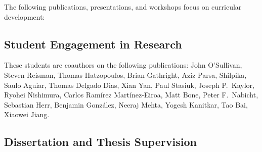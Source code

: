 The following publications, presentations, and workshops focus on curricular development:

\begin{refsection}
\nocite{Scala_2019}
\nocite{CDERBook}
\nocite{ScalaDays_2017}
\nocite{wl_honig_framework_2015}
\nocite{mark_lewis_scala_2014}
\nocite{mark_lewis_using_2013}
\nocite{EduPar2012}
\nocite{EduPar2011}
\nocite{2003_AOSD}
\nocite{chung2003}
\nocite{Triveni_OOPSLAEDU_1998}
\nocite{Laufer_MCC_1997}
\printbibliography[heading=none,sorting=ynt]
\end{refsection}
   

\subsection{Student Engagement in Research}

These students are coauthors on the following publications:
John O’Sullivan,
Steven Reisman, 
Thomas Hatzopoulos, 
Brian Gathright, 
Aziz Parsa,
Shilpika, 
Saulo Aguiar,
Thomas Delgado Dias, 
Xian Yan,
Paul Stasiuk,
Joseph P.\ Kaylor,
Ryohei Nishimura, 
Carlos Ramírez Martínez-Eiroa,
Matt Bone, 
Peter F.\ Nabicht,
Sebastian Herr,
Benjamin González,
Neeraj Mehta, 
Yogesh Kanitkar,
Tao Bai,
Xiaowei Jiang.

\begin{refsection}
\nocite{Scala_2019}
\nocite{doi:10.4137/EBO.S32757}
\nocite{WSSSPE_2015}
\nocite{GCASR_2015}
\nocite{GCASR_2015}
\nocite{gcasr_2013_environmental_data}
\nocite{gcasr_2013_tablets}
\nocite{kaylor_simplifying_2012}
\nocite{kaylor_restfs_2011}
\nocite{DBLP:conf/icsoft/2011-2}
\nocite{george_k_thiruvathukal_virtualization_2010}
\nocite{kaylor_online_2010}
\nocite{k_laufer_putting_2009}
\nocite{DBLP:conf/seke/HerrLSTW08}
\nocite{matt_bone_taming_2008}
\nocite{IPDPS_2007}
\nocite{konstantin_laufer_hike_2007}
\nocite{chung2003}
\nocite{DBLP:conf/cp/GuptaJJJL00}
\printbibliography[heading=none,sorting=ynt]
\end{refsection}


\subsection{Dissertation and Thesis Supervision}


